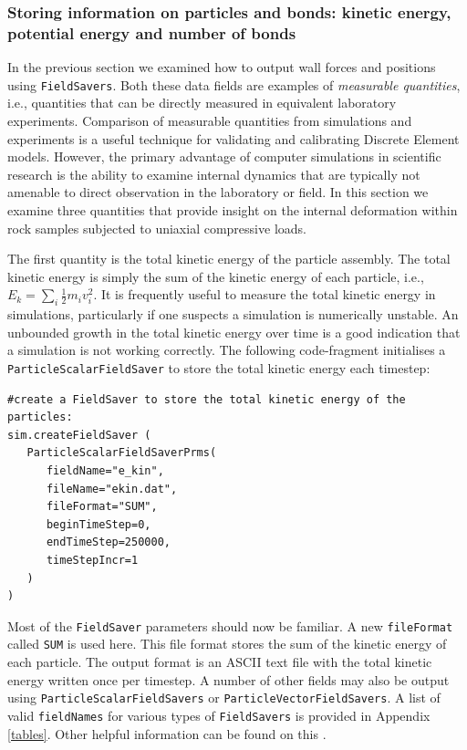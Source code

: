 \subsubsection{Storing information on particles and bonds: kinetic energy, potential energy and number of bonds}

In the previous section we examined how to output wall forces and positions using \texttt{FieldSavers}. Both these data fields are examples of \emph{measurable quantities}, i.e., quantities that can be directly measured in equivalent laboratory experiments. Comparison of measurable quantities from simulations and experiments is a useful technique for validating and calibrating Discrete Element models. However, the primary advantage of computer simulations in scientific research is the ability to examine internal dynamics that are typically not amenable to direct observation in the laboratory or field. In this section we examine three quantities that provide insight on the internal deformation within rock samples subjected to uniaxial compressive loads. 

The first quantity is the total kinetic energy of the particle assembly. The total kinetic energy is simply the sum of the kinetic energy of each particle, i.e., $E_k = \sum_i \frac{1}{2} m_i v_i^2$. It is frequently useful to measure the total kinetic energy in simulations, particularly if one suspects a simulation is numerically unstable. An unbounded growth in the total kinetic energy over time is a good indication that a simulation is not working correctly. The following code-fragment initialises a \texttt{ParticleScalarFieldSaver} to store the total kinetic energy each timestep:

\begin{verbatim}
#create a FieldSaver to store the total kinetic energy of the particles:
sim.createFieldSaver (
   ParticleScalarFieldSaverPrms(
      fieldName="e_kin",
      fileName="ekin.dat",
      fileFormat="SUM",
      beginTimeStep=0,
      endTimeStep=250000,
      timeStepIncr=1
   )
)
\end{verbatim}

\noindent
Most of the \texttt{FieldSaver} parameters should now be familiar.  A new \texttt{fileFormat} called \texttt{SUM} is used here. This file format stores the sum of the kinetic energy of each particle. The output format is an ASCII text file with the total kinetic energy written once per timestep.  A number of other fields may also be output using \texttt{ParticleScalarFieldSavers} or \texttt{ParticleVectorFieldSavers}. A list of valid \texttt{fieldNames} for various types of \texttt{FieldSav\+ers} is provided in Appendix \ref{tables}.  Other helpful information can be found on this . 

